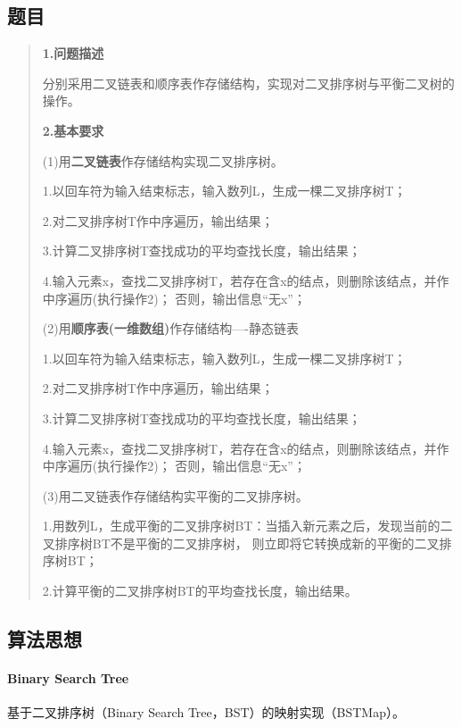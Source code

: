 \documentclass[UTF8]{ctexart}
\begin{document}
\subsection*{题目}
\begin{abstract}
    \textbf{1.问题描述}
    
    分别采用二叉链表和顺序表作存储结构，实现对二叉排序树与平衡二叉树的操作。

    \textbf{2.基本要求}

    (1)用\textbf{二叉链表}作存储结构实现二叉排序树。

        1.以回车符为输入结束标志，输入数列L，生成一棵二叉排序树T；

        2.对二叉排序树T作中序遍历，输出结果；

        3.计算二叉排序树T查找成功的平均查找长度，输出结果；

        4.输入元素x，查找二叉排序树T，若存在含x的结点，则删除该结点，并作中序遍历(执行操作2)；
        否则，输出信息“无x”；

    (2)用\textbf{顺序表(一维数组)}作存储结构----静态链表

        1.以回车符为输入结束标志，输入数列L，生成一棵二叉排序树T；

        2.对二叉排序树T作中序遍历，输出结果；

        3.计算二叉排序树T查找成功的平均查找长度，输出结果；

        4.输入元素x，查找二叉排序树T，若存在含x的结点，则删除该结点，并作中序遍历(执行操作2)；
        否则，输出信息“无x”；

    (3)用二叉链表作存储结构实平衡的二叉排序树。

        1.用数列L，生成平衡的二叉排序树BT：当插入新元素之后，发现当前的二叉排序树BT不是平衡的二叉排序树，
        则立即将它转换成新的平衡的二叉排序树BT；

        2.计算平衡的二叉排序树BT的平均查找长度，输出结果。

\end{abstract}


\subsection*{算法思想}

\paragraph*{Binary Search Tree}
基于二叉排序树（Binary Search Tree，BST）的映射实现（BSTMap）。
\end{document}
